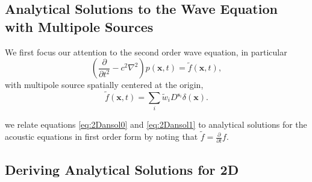 \subsection{Analytical Solutions to the Wave Equation with Multipole Sources}

We first focus our attention to the second order wave equation, in particular
\begin{equation}\label{eq:2DWE}
        \left( \frac{\partial}{\partial t^2} - c^2 \nabla^2 \right) p(\mathbf x,t) = \tilde f(\mathbf x,t),
\end{equation}
with multipole source spatially centered at the origin,
\[
	\tilde f(\mathbf x,t) = \sum_{i} \tilde w_i D^{\mathbf s_i} \delta(\mathbf x).
\]


we relate equations \ref{eq:2Dansol0} and \ref{eq:2Dansol1} to analytical solutions for the acoustic equations in first order form by noting that $\tilde f = \tfrac{\partial}{\partial t}f$.





\subsection{Deriving Analytical Solutions for 2D}















